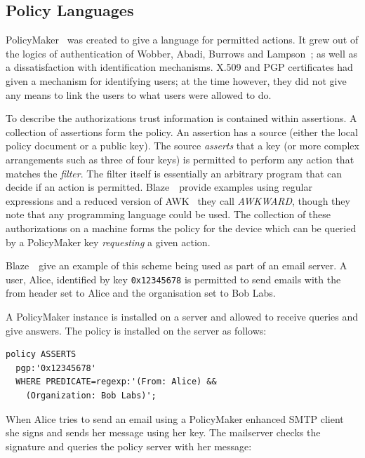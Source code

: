 \documentclass[thesis.tex]{subfiles}
\begin{document}
\subsection{Policy Languages}

PolicyMaker~\cite{blaze_decentralized_1996} was created to give a
language for permitted actions.  It grew out of the logics of
authentication of Wobber, Abadi, Burrows and Lampson~\cite{wobber_authentication_1994,abadi_calculus_1991}; as well as a
dissatisfaction with identification mechanisms.  X.509 and PGP
certificates had given a mechanism for identifying users; at the time
however, they did not give any means to link the users to what users
were allowed to do.

To describe the authorizations trust information is contained within
assertions.  A collection of assertions form the policy.  An assertion
has a source (either the local policy document or a public key). The
source \emph{asserts} that a key (or more complex arrangements such as
three of four keys) is permitted to perform any action that matches
the \emph{filter}.  The filter itself is essentially an arbitrary
program that can decide if an action is permitted.
Blaze~\etal~provide examples using regular expressions and a reduced
version of AWK~\cite{aho_awk-pattern_1979} they call \emph{AWKWARD},
though they note that any programming language could be used.  The
collection of these authorizations on a machine forms the policy for
the device which can be queried by a PolicyMaker key \emph{requesting}
a given action.

Blaze~\etal~give an example of this scheme being used as part of an
email server.  A user, Alice, identified by key \texttt{0x12345678} is
permitted to send emails with the from header set to Alice and the
organisation set to Bob Labs.

A PolicyMaker instance is installed on a server and allowed to receive queries and give answers.
The policy is installed on the server as follows:

\begin{lstlisting}
policy ASSERTS
  pgp:'0x12345678'
  WHERE PREDICATE=regexp:'(From: Alice) &&
    (Organization: Bob Labs)';
\end{lstlisting}

When Alice tries to send an email using a PolicyMaker enhanced SMTP
client she signs and sends her message using her key.  The mailserver
checks the signature and queries the policy server with her message:
\end{document}
